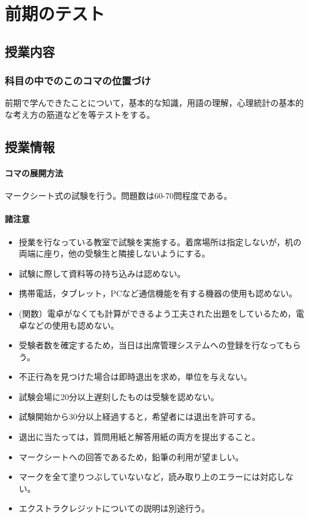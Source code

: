 \section{前期のテスト}
\label{D1_lesson15}

\subsection{授業内容}
\subsubsection{科目の中でのこのコマの位置づけ}
前期で学んできたことについて，基本的な知識，用語の理解，心理統計の基本的な考え方の筋道などを等テストをする。
\subsection{授業情報}
\paragraph{コマの展開方法}
マークシート式の試験を行う。問題数は60-70問程度である。
\paragraph{諸注意}
\begin{itemize}
    \item 授業を行なっている教室で試験を実施する。着席場所は指定しないが，机の両端に座り，他の受験生と隣接しないようにする。
    \item 試験に際して資料等の持ち込みは認めない。
    \item 携帯電話，タブレット，PCなど通信機能を有する機器の使用も認めない。
    \item (関数）電卓がなくても計算ができるよう工夫された出題をしているため，電卓などの使用も認めない。
    \item 受験者数を確定するため，当日は出席管理システムへの登録を行なってもらう。
    \item 不正行為を見つけた場合は即時退出を求め，単位を与えない。
    \item 試験会場に20分以上遅刻したものは受験を認めない。
    \item 試験開始から30分以上経過すると，希望者には退出を許可する。
    \item 退出に当たっては，質問用紙と解答用紙の両方を提出すること。
    \item マークシートへの回答であるため，鉛筆の利用が望ましい。
    \item マークを全て塗りつぶしていないなど，読み取り上のエラーには対応しない。
    \item エクストラクレジットについての説明は別途行う。
\end{itemize}
